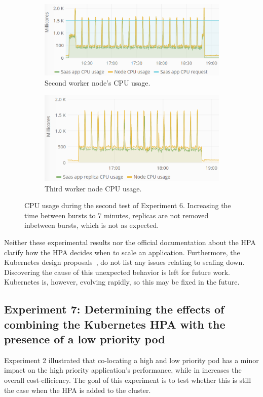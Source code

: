 \begin{figure}
\centering
\begin{subfigure}[b]{\columnwidth}
\centering
\includegraphics[width=0.70\columnwidth]{Images/Experiments/CPU/Grafana/cpu-saas-hpa-bursty-3-1.PNG}
\caption{Second worker node's CPU usage.}
\label{fig:cpu-saas-hpa-bursty-3-1}
\end{subfigure}
\hfill
\begin{subfigure}[b]{\columnwidth}
\centering
\includegraphics[width=0.70\columnwidth]{Images/Experiments/CPU/Grafana/cpu-saas-hpa-bursty-3-2.PNG}
\caption{Third worker node CPU usage.}
\label{fig:cpu-saas-hpa-bursty-3-2}
\end{subfigure}
\hfill
\vspace*{-7mm}
\caption{CPU usage during the second test of Experiment 6. Increasing the time between bursts to 7 minutes, replicas are not removed inbetween bursts, which is not as expected.}
\label{fig:cpu-saas-hpa-bursty-2}
\end{figure}

Neither these experimental results nor the official documentation about the HPA~\citep{hpa-algorithm-details} clarify how the HPA decides when to scale an application. Furthermore, the Kubernetes design proposals~\citep{autoscaling-design-proposals}, do not list any issues relating to scaling down. Discovering the cause of this unexpected behavior is left for future work. Kubernetes is, however, evolving rapidly, so this may be fixed in the future.  


\subsection{Experiment 7: Determining the effects of combining the Kubernetes HPA with the presence of a low priority pod}
Experiment 2 illustrated that co-locating a high and low priority pod has a minor impact on the high priority application's performance, while in increases the overall cost-efficiency. The goal of this experiment is to test whether this is still the case when the HPA is added to the cluster. 

